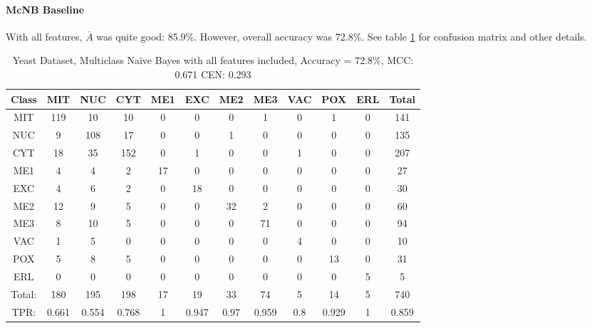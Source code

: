 \paragraph{McNB Baseline}
With all features, $\overline{A}$ was quite good: 85.9\%.  However, overall accuracy was 72.8\%.  See table \ref{tab:yeastmcnbbase} for confusion matrix and other details.
\\
\begin{table}[h!]
\begin{tabular}{|c|c|c|c|c|c|c|c|c|c|c|c|}
	\hline
Class&MIT&NUC&CYT&ME1&EXC&ME2&ME3&VAC&POX&ERL&Total\\\hline
MIT&119&10&10&0&0&0&1&0&1&0&141\\
NUC&9&108&17&0&0&1&0&0&0&0&135\\
CYT&18&35&152&0&1&0&0&1&0&0&207\\
ME1&4&4&2&17&0&0&0&0&0&0&27\\
EXC&4&6&2&0&18&0&0&0&0&0&30\\
ME2&12&9&5&0&0&32&2&0&0&0&60\\
ME3&8&10&5&0&0&0&71&0&0&0&94\\
VAC&1&5&0&0&0&0&0&4&0&0&10\\
POX&5&8&5&0&0&0&0&0&13&0&31\\
ERL&0&0&0&0&0&0&0&0&0&5&5\\
\hline
Total:&180&195&198&17&19&33&74&5&14&5&740\\
TPR:&0.661&0.554&0.768&1&0.947&0.97&0.959&0.8&0.929&1&0.859\\
\hline
\end{tabular}
\caption[Yeast: Multiclass Na\"ive Bayes without Feature Selection Confusion Matrix]{Yeast Dataset, Multiclass Na\"ive Bayes with all features included, Accuracy = 72.8\%, MCC: 0.671 CEN: 0.293}
\label{tab:yeastmcnbbase}
\end{table}

